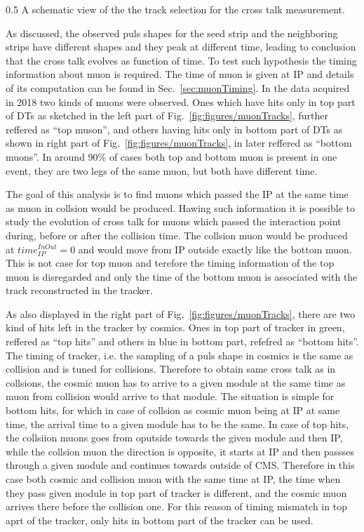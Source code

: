                  {0.5}       %
                 { A schematic view of the the track selection for the cross talk measurement. }

As discussed, the observed puls shapes for the seed strip and the neighboring strips have different shapes and they peak at different time, leading to conclusion that the cross talk evolves as function of time. To test such hypothesis the timing information about muon is required. The time of muon is given at IP and details of its computation can be found in Sec.~\ref{sec:muonTiming}.  In the data acquired in 2018 two kinds of muons were observed. Ones which have hits only in top part of DTs as sketched in the left part of Fig.~\ref{fig:figures/muonTracks}, further reffered as ``top muson'',  and others having hits only in bottom part of DTs as shown in right part of Fig.~\ref{fig:figures/muonTracks}, in later reffered as ``bottom muons''. In around 90\% of cases both top and bottom muon is present in one event, they are two legs of the same muon, but both have different time. 

The goal of this analysis is to find muons which passed the IP at the same time as muon in collsion would be produced. Hawing such information it is possible to study the evolution of cross talk for muons which passed the interaction point during, before or after the collision time. The collsion muon would be produced at $time_{IP}^{InOut}=0$ and would move from IP outside exactly like the bottom muon. This is not case for top muon and terefore the timing information of the top muon is disregarded and only the time of the bottom muon is associated with the track reconstructed in the tracker. 

As also displayed in the right part of Fig.~\ref{fig:figures/muonTracks}, there are two kind of hits left in the tracker by cosmics. Ones in top part of tracker in green, reffered as ``top hits'' and others in blue in bottom part, refefred as ``bottom hits''. The timing of tracker, i.e. the sampling of a puls shape in cosmics is the same as collision and is tuned for collisions. Therefore to obtain same cross talk as in collsions, the cosmic muon has to arrive to a given module at the same time as muon from collision would arrive to that module. The situation is simple for bottom hits, for which in case of collsion as cosmic muon being at IP at same time, the arrival time to a given module has to be the same. In case of top hits, the collsiion muons goes from oputside towards the given module and then IP, while the collsion muon the direction is opposite, it starts at IP and then passses through a given module and continues towards outside of CMS. Therefore in this case both cosmic and collision muon with the same time at IP, the time when they pass given module in top part of tracker is different, and the cosmic muon arrives there before the collision one. For this reason of timing mismatch in top aprt of the tracker, only hits in bottom part of the tracker can be used.


